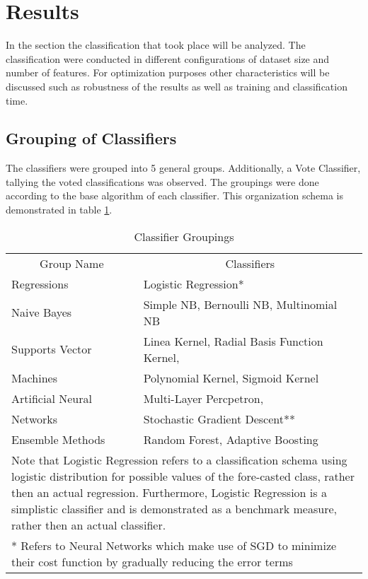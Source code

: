 \section{Results}
	In the section the classification that took place will be analyzed. The classification were conducted in different configurations of  dataset size and number of features. For optimization purposes other characteristics will be discussed such as robustness of the results as well as training and classification time.
	
	\subsection{Grouping of Classifiers}
		The classifiers were grouped into 5 general groups. Additionally, a Vote Classifier, tallying the voted classifications was observed. The groupings were done according to the base algorithm of each classifier. This organization schema is demonstrated in table \ref{table:class_grps}.
		
		\begin{table}[h]	
			\begin{center}
				\begin{tabular}{l | l} 
					\hline
					\hline
					\multicolumn{1}{c|}{\multirow{2}{*}{Group Name}} & \multicolumn{1}{|c}{\multirow{2}{*}{Classifiers}}\\ 
					 &   \\ 
					\hline
					Regressions 	  & Logistic Regression*  \\
					\hline
					Naive Bayes       & Simple NB, Bernoulli NB, Multinomial NB \\
					\hline
					\vspace*{-1mm} 
					Supports Vector   & Linea Kernel, Radial Basis Function Kernel,\\
					Machines		  & Polynomial Kernel, Sigmoid Kernel \\
					\hline
					\vspace*{-1mm} 
					Artificial Neural & Multi-Layer Percpetron,  \\
					Networks		  & Stochastic Gradient Descent** \\
					\hline
					Ensemble Methods  & Random Forest, Adaptive Boosting \\
					\hline\hline
					\multicolumn{2}{p{1\textwidth}}{ \footnotesize * Note that Logistic Regression refers to a classification schema using logistic distribution for possible values of the fore-casted class, rather then an actual regression. Furthermore, Logistic Regression is a simplistic classifier and is demonstrated as a benchmark measure, rather then an actual classifier.} \\
					\multicolumn{2}{p{1\textwidth}}{ \footnotesize ** Refers to Neural Networks which make use of SGD to minimize their cost function by gradually reducing the error terms} \\
				\end{tabular}	
			\end{center}
			\caption[Classifier Groupings]{Classifier Groupings}
			\label{table:class_grps}
		\end{table}
	
